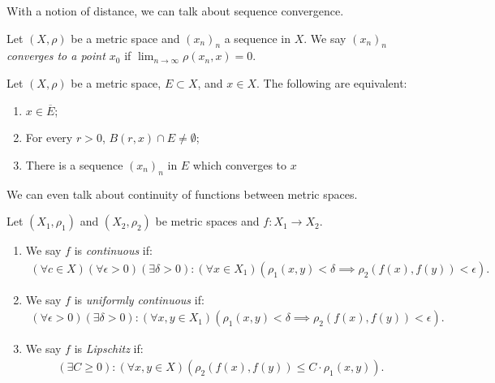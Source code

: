     With a notion of distance, we can talk about sequence convergence.

    \begin{definition}
        Let $(X,\rho)$ be a metric space and $(x_n)_n$ a sequence in $X$. We say $(x_n)_n$ \textit{converges to a point $x_0$} if $\lim_{n \rightarrow \infty}\rho(x_n,x) = 0$.
    \end{definition}

    \begin{proposition}
        Let $(X,\rho)$ be a metric space, $E \subset X$, and $x \in X$. The following are equivalent:
        \begin{enumerate}[label = (\arabic*),itemsep=1pt,topsep=3pt]
            \item $x \in \overline{E}$;
            \item For every $r > 0$, $B(r,x) \cap E \neq \emptyset$;
            \item There is a sequence $(x_n)_n$ in $E$ which converges to $x$
        \end{enumerate}
    \end{proposition}

    We can even talk about continuity of functions between metric spaces.

    \begin{definition}
        Let $(X_1,\rho_1)$ and $(X_2,\rho_2)$ be metric spaces and $f:X_1 \rightarrow X_2$. 
        \begin{enumerate}[label = (\arabic*),itemsep=1pt,topsep=3pt]
            \item We say $f$ is \textit{continuous} if:
                \begin{equation*}
                \begin{split}
                    (\forall c \in X)(\forall \epsilon > 0)(\exists \delta > 0):(\forall x \in X_1)(\rho_1(x,y) < \delta \implies \rho_2(f(x),f(y))<\epsilon).
                \end{split}
                \end{equation*}
            \item We say $f$ is \textit{uniformly continuous} if:
                \begin{equation*}
                \begin{split}
                    (\forall \epsilon > 0)(\exists \delta > 0):(\forall x,y \in X_1)(\rho_1(x,y) < \delta \implies \rho_2(f(x),f(y))<\epsilon).
                \end{split}
                \end{equation*}
            \item We say $f$ is \textit{Lipschitz} if:
                \begin{equation*}
                \begin{split}
                    (\exists C \geq 0):(\forall x,y \in X)(\rho_2(f(x),f(y)) \leq C\cdot\rho_1(x,y)).
                \end{split}
                \end{equation*}
        \end{enumerate}
    \end{definition}

